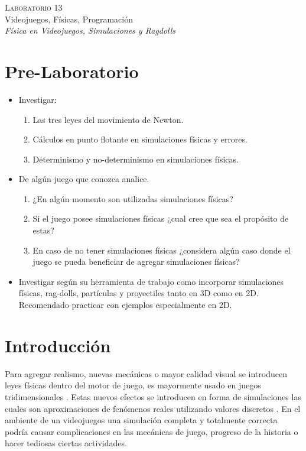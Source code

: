\begin{center}
\textsc{\Large Laboratorio 13}~\\
{\large Videojuegos, Físicas, Programación}~\\
\emph{Física en Videojuegos, Simulaciones y Ragdolls}
\end{center}

\section{Pre-Laboratorio}
\begin{itemize}
\item Investigar:
\begin{enumerate}
  \item Las tres leyes del movimiento de Newton.
  \item Cálculos en punto flotante en simulaciones físicas y errores.
  \item Determinismo y no-determinismo en simulaciones físicas.
\end{enumerate}
\item De algún juego que conozca analice.
\begin{enumerate}
  \item ¿En algún momento son utilizadas simulaciones físicas? 
  \item Si el juego posee simulaciones físicas ¿cual cree que sea el propósito de estas?
  \item En caso de no tener simulaciones físicas ¿considera algún caso donde el juego se pueda beneficiar de agregar simulaciones físicas?
\end{enumerate}
\item Investigar según su herramienta de trabajo como incorporar simulaciones físicas, rag-dolls, partículas y proyectiles tanto en 3D como en 2D. Recomendado practicar con ejemplos especialmente en 2D.
\end{itemize}

\section{Introducción}
Para agregar realismo, nuevas mecánicas o mayor calidad visual se introducen leyes físicas dentro del motor de juego, es mayormente usado en juegos tridimensionales \cite[p.~325]{jenkinscreatinggames}. Estas nuevos efectos se introducen en forma de simulaciones las cuales son aproximaciones de fenómenos reales utilizando valores discretos \cite{ian_gamephysics}. En el ambiente de un videojuegos una simulación completa y totalmente correcta podría causar complicaciones en las mecánicas de juego, progreso de la historia o hacer tediosas ciertas actividades.

